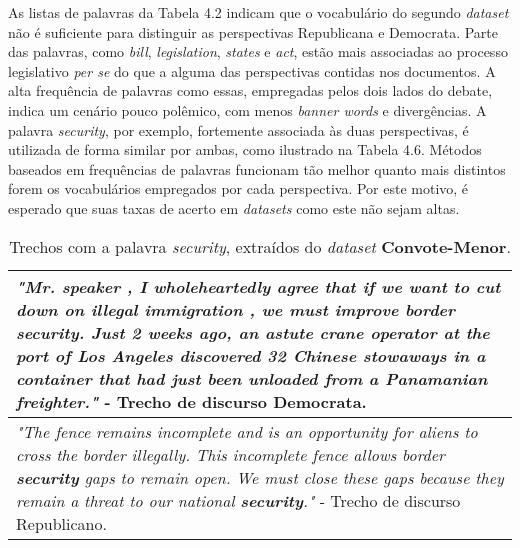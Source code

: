 

As listas de palavras da Tabela 4.2 indicam que o vocabulário do segundo \emph{dataset} não é suficiente para distinguir as perspectivas Republicana e Democrata. Parte das palavras, como \emph{bill}, \emph{legislation}, \emph{states} e \emph{act}, estão mais associadas ao processo legislativo \emph{per se} do que a alguma das perspectivas contidas nos documentos. A alta frequência de palavras como essas, empregadas pelos dois lados do debate, indica um cenário pouco polêmico, com menos \emph{banner words} e divergências. A palavra \emph{security}, por exemplo, fortemente associada às duas perspectivas, é utilizada de forma similar por ambas, como ilustrado na Tabela 4.6. Métodos baseados em frequências de palavras funcionam tão melhor quanto mais distintos forem os vocabulários empregados por cada perspectiva. Por este motivo, é esperado que suas taxas de acerto em \emph{datasets} como este não sejam altas.

\begin{table}[t]
\centering
\begin{tabular}{| p{10cm} | }
\hline

\emph{"Mr. speaker , I wholeheartedly agree that if we want to cut down on illegal immigration , we must improve border \textbf{security}. Just 2 weeks ago, an astute crane operator at the port of Los Angeles discovered 32 Chinese stowaways in a container that had just been unloaded from a Panamanian freighter."} - Trecho de discurso Democrata. \\ \hline


\emph{"The fence remains incomplete and is an opportunity for aliens to cross the border illegally. This incomplete fence allows border \textbf{security} gaps to remain open.  We must close these gaps because they remain a threat to our national \textbf{security}."} - Trecho de discurso Republicano. \\ \hline
\end{tabular}
\label{6}
\caption{Trechos com a palavra \emph{security}, extraídos do \emph{dataset} \textbf{Convote-Menor}.}
\end{table}


